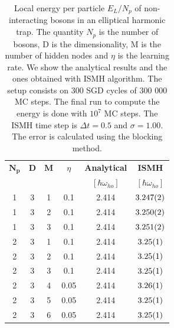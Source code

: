 \begin{table}[H]
	\centering
	\caption{Local energy per particle $E_L/N_p$ of non-interacting bosons in an elliptical harmonic trap. The quantity $N_p$ is the number of bosons, D is the dimensionality, M is the number of hidden nodes and $\eta$ is the learning rate. We show the analytical results and the ones obtained with ISMH algorithm. The setup consists on 300 SGD cycles of 300 000 MC steps. The final run to compute the energy is done with $10^7$ MC steps. The ISMH time step is $\Delta t = 0.5$ and $\sigma = 1.00$.  The error is calculated using the blocking method.}
	\begin{tabular}{c c c c |c  c} 
		$\boldsymbol{N_p}$ & \textbf{D}  & $\boldsymbol{M}$ & $\eta$ & \textbf{Analytical} &\textbf{ISMH} \\
		&&&&$[\hbar\omega_{ho}]$ &$[\hbar\omega_{ho}]$\\\hline
		1 & 3 & 1 &0.1 &           2.414                &          $\SI{3.247\pm 0.002}{}$              \\
		1 & 3 & 2 &0.1 &           2.414                 &       $\SI{3.250\pm 0.002}{}$                 \\
		1 & 3 & 3 &0.1 &           2.414                 &       $\SI{3.251\pm 0.002}{}$                 \\ \hline
		2 & 3 & 1 &0.1 &           2.414                 &      $\SI{3.25\pm 0.01}{}$                  \\
		2 & 3 & 2 &0.1 &           2.414                 &      $\SI{3.25\pm 0.01}{}$                  \\
		2 & 3 & 3 &0.1 &           2.414                 &      $\SI{3.25\pm 0.01}{}$                 \\
		2 & 3 & 4 &0.05 &           2.414                 &      $\SI{3.26\pm 0.01}{}$            \\
		2 & 3 & 5 &0.05&            2.414                &      $\SI{3.25\pm 0.01}{}$                  \\
		2 & 3 & 6 &0.05 &           2.414                 &      $\SI{3.25\pm 0.01}{}$                  \\ 
	\end{tabular}
	\label{Tab:3.2}
\end{table} 

